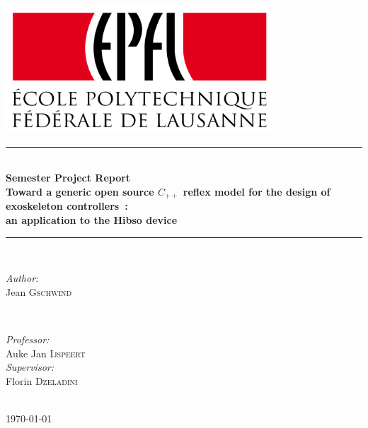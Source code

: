 \documentclass[a4paper,12pt]{article}
\begin{document}
\begin{titlepage}

\newcommand{\HRule}{\rule{\linewidth}{0.5mm}} 
\center %
 

\includegraphics[width=10cm]{epfl_logo.png}\\[1cm]


\HRule \\[0.4cm]
{ \huge \bfseries Semester Project Report}\\[0.4cm]
{ \Large \bfseries Toward a generic open source $C_{++}$ reflex model for the design of exoskeleton controllers~:\\[0.3cm]an application to the Hibso device}\\[0.4cm]
\HRule \\[1.5cm]
 

\begin{minipage}{0.4\textwidth}
\begin{flushleft} \large
\emph{Author:}\\
Jean \textsc{Gschwind} %
\end{flushleft}
\end{minipage}
~
\begin{minipage}{0.4\textwidth}
\begin{flushright} \large
\emph{Professor:} \\
Auke Jan \textsc{Ijspeert}\\
\emph{Supervisor:}\\ %
Florin \textsc{Dzeladini} 
\end{flushright}
\end{minipage}\\[2cm]


{\large \today}\\[2cm]

\vfill

\end{titlepage}
\end{document}
